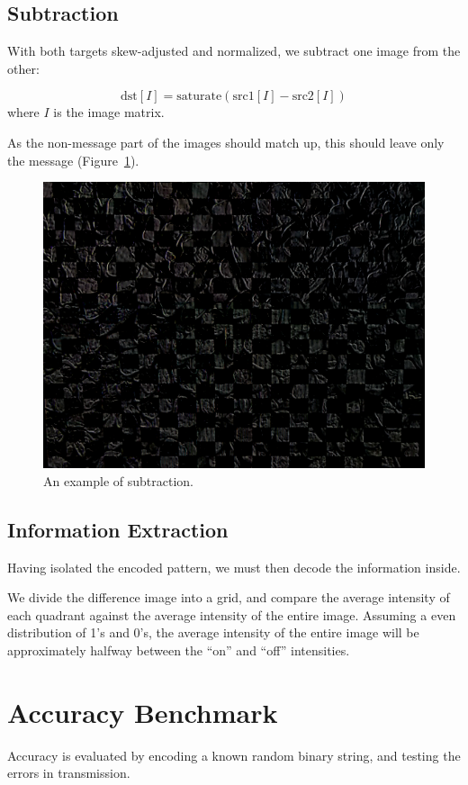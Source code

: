 \documentclass[11pt, letterpaper]{article}
\begin{document}
\subsection{Subtraction}
With both targets skew-adjusted and normalized, we subtract one image from the other:

$$\text{dst}[I] = \text{saturate}(\text{src1}[I] - \text{src2}[I])$$ where $I$ is the image matrix\cite{opencv_subtraction}.

As the non-message part of the images should match up, this should leave only the message (Figure~\ref{fig:subtract}).

\begin{figure}[hbtp]
\centering
\includegraphics[scale=0.2]{img/subtract.png}
\caption{An example of subtraction.}
\label{fig:subtract}
\end{figure}

\subsection{Information Extraction}
Having isolated the encoded pattern, we must then decode the information inside.

We divide the difference image into a grid, and compare the average intensity of each quadrant against the average intensity of the entire image.
Assuming a even distribution of 1's and 0's, the average intensity of the entire image will be approximately halfway between the ``on'' and ``off'' intensities.

\section{Accuracy Benchmark}
Accuracy is evaluated by encoding a known random binary string, and testing the errors in transmission.
\end{document}
